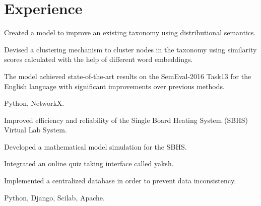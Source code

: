 
\section{Experience}

\begin{tightemize}
\item Created a model to improve an existing taxonomy using distributional semantics.
\item Devised a clustering mechanism to cluster nodes in the taxonomy using similarity scores calculated with the help of different word embeddings.
\item The model achieved state-of-the-art results on the SemEval-2016 Task13 for the English language with significant improvements over previous methods.
\item {} Python, NetworkX.
\end{tightemize}
\sectionsep

\begin{tightemize}
\item Improved efficiency and reliability of the Single Board Heating System (SBHS) Virtual Lab System.
\item Developed a mathematical model simulation for the SBHS.
\item Integrated an online quiz taking interface called yaksh.
\item Implemented a centralized database in order to prevent data inconsistency.
\item {} Python, Django, Scilab, Apache.
\end{tightemize}
\sectionsep